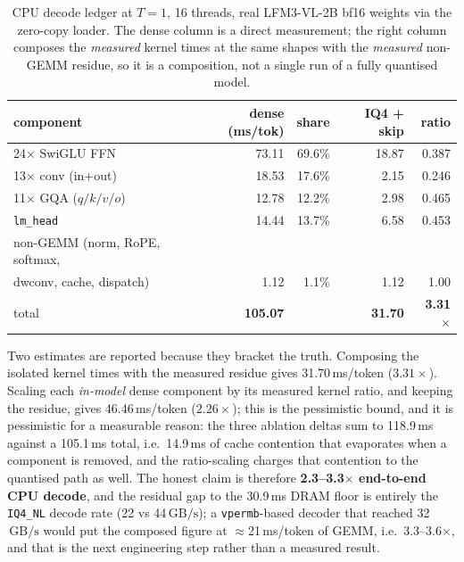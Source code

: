 \documentclass[11pt]{article}
\newcommand{\code}[1]{\texttt{\small #1}}
\newcommand{\gbps}{\ensuremath{\,\mathrm{GB/s}}}
\begin{document}
\begin{table}[h]\centering\small
\begin{tabular}{lrrrr}
\toprule
component & dense (ms/tok) & share & IQ4 + skip & ratio \\
\midrule
24$\times$ SwiGLU FFN & 73.11 & 69.6\% & 18.87 & 0.387 \\
13$\times$ conv (in+out) & 18.53 & 17.6\% & 2.15 & 0.246 \\
11$\times$ GQA ($q/k/v/o$) & 12.78 & 12.2\% & 2.98 & 0.465 \\
\code{lm\_head} & 14.44 & 13.7\% & 6.58 & 0.453 \\
non-GEMM (norm, RoPE, softmax, & & & & \\
\quad dwconv, cache, dispatch) & 1.12 & 1.1\% & 1.12 & 1.00 \\
\midrule
total & \textbf{105.07} & & \textbf{31.70} & \textbf{3.31$\times$} \\
\bottomrule
\end{tabular}
\caption{CPU decode ledger at $T{=}1$, 16 threads, real LFM3-VL-2B bf16 weights via the
zero-copy loader. The dense column is a direct measurement; the right column composes the
\emph{measured} kernel times at the same shapes with the \emph{measured} non-GEMM residue,
so it is a composition, not a single run of a fully quantised model. }
\end{table}

Two estimates are reported because they bracket the truth. Composing the isolated kernel
times with the measured residue gives 31.70\,ms/token ($3.31\times$). Scaling each
\emph{in-model} dense component by its measured kernel ratio, and keeping the residue,
gives 46.46\,ms/token ($2.26\times$); this is the pessimistic bound, and it is pessimistic
for a measurable reason: the three ablation deltas sum to 118.9\,ms against a 105.1\,ms
total, i.e.\ 14.9\,ms of cache contention that evaporates when a component is removed, and
the ratio-scaling charges that contention to the quantised path as well. The honest claim
is therefore \textbf{2.3--3.3$\times$ end-to-end CPU decode}, and the residual gap to the
30.9\,ms DRAM floor is entirely the \code{IQ4\_NL} decode rate (22 vs 44\gbps); a
\code{vpermb}-based decoder that reached 32\gbps{} would put the composed figure at
$\approx$21\,ms/token of GEMM, i.e.\ 3.3--3.6$\times$, and that is the next engineering
step rather than a measured result.
\end{document}
